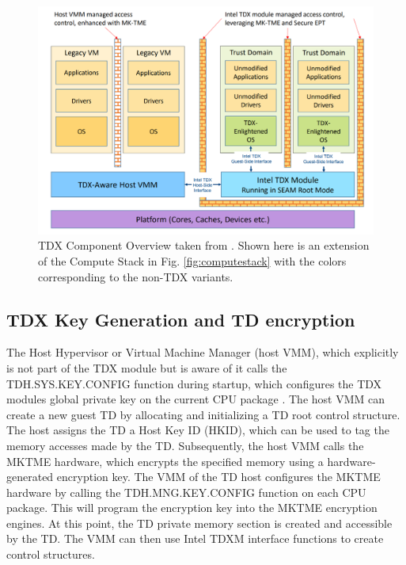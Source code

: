 \begin{figure}
\centering
\includegraphics[width=\textwidth]{figures/TDX-Component-Overview}
\caption{TDX Component Overview taken from \cite[p.~19]{tdx-module-10-public-specpdf_nodate}. Shown here is an extension of the Compute Stack in Fig. \ref{fig:computestack} with the colors corresponding to the non-TDX variants.}
\label{fig:component-overview}
\end{figure}
\subsection{TDX Key Generation and TD encryption}
The Host Hypervisor or Virtual Machine Manager (host VMM), which explicitly is not part of the TDX module but is aware of it calls the TDH.SYS.KEY.CONFIG function during startup, which configures the TDX modules global private key on the current CPU package \cite{intel_intel-tdx-module-15-abi-spec-348551001pdf_2024}.  The host VMM can create a new guest TD by allocating and initializing a TD root control structure. The host assigns the TD a Host Key ID (HKID), which can be used to tag the memory accesses made by the TD\cite{tdx-module-10-public-specpdf_nodate}. Subsequently, the host VMM calls the MKTME hardware, which encrypts the specified memory using a hardware-generated encryption key\cite{multi-key-total-memory-encryption-spec-14pdf_nodate}. The VMM of the TD host configures the MKTME hardware by calling the TDH.MNG.KEY.CONFIG function on each CPU package. This will program the encryption key into the MKTME encryption engines\cite{tdx-module-10-public-specpdf_nodate}. At this point, the TD private memory section is created and accessible by the TD. The VMM can then use Intel TDXM interface functions to create control structures. 
